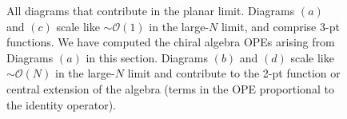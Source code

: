 \documentclass[../main.tex]{subfiles}
\begin{document}
\begin{figure}
\begin{tikzpicture}[scale={0.75}]
	\end{tikzpicture}
	\caption{All diagrams that contribute in the planar limit.  Diagrams $(a)$ and $(c)$ scale like $\sim \mathcal{O}(1)$ in the large-$N$ limit, and comprise 3-pt functions. We have computed the chiral algebra OPEs arising from Diagrams $(a)$ in this section. Diagrams $(b)$ and $(d)$ scale like $\sim \mathcal{O}(N)$ in the  large-$N$ limit and contribute to the 2-pt function or central extension of the algebra (terms in the OPE proportional to the identity operator). \label{fig:alldiagramsplanar}}
\end{figure}
\end{document}
